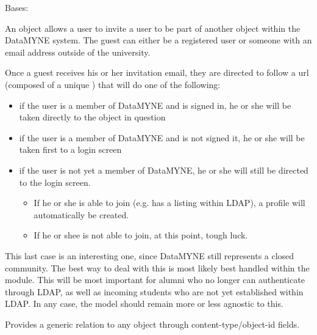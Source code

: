 \documentclass[letterpaper,10pt,english]{sphinxmanual}
\begin{document}
\begin{fulllineitems}
\label{generated/apps.profiles.models:apps.profiles.models.Invitation}
Bases: 

An  object allows a  user to invite a  user
to be part of another object within the DataMYNE system.  The guest can either 
be a registered user or someone with an email address outside of the university.

Once a guest receives his or her invitation email, they are directed to follow
a url (composed of a unique ) that will do one of the following:
\begin{itemize}
\item {} 
if the user is a member of DataMYNE and is signed in, he or she will be taken
directly to the object in question

\item {} 
if the user is a member of DataMYNE and is not signed it, he or she will be
taken first to a login screen

\item {} 
if the user is not yet a member of DataMYNE, he or she will still be directed
to the login screen.
\begin{itemize}
\item {} 
If he or she is able to join (e.g. has a listing within LDAP), a profile will
automatically be created.

\item {} 
If he or shee is not able to join, at this point, tough luck.

\end{itemize}

\end{itemize}

This last case is an interesting one, since DataMYNE still represents a closed
community.  The best way to deal with this is most likely best handled within
the  module.  This will be most important for alumni who
no longer can authenticate through LDAP, as well as incoming students who are
not yet established within LDAP.  In any case, the  model should
remain more or less agnostic to this.


\begin{fulllineitems}
\label{generated/apps.profiles.models:apps.profiles.models.Invitation.content_object}
Provides a generic relation to any object through content-type/object-id
fields.

\end{fulllineitems}


\end{fulllineitems}
\end{document}
